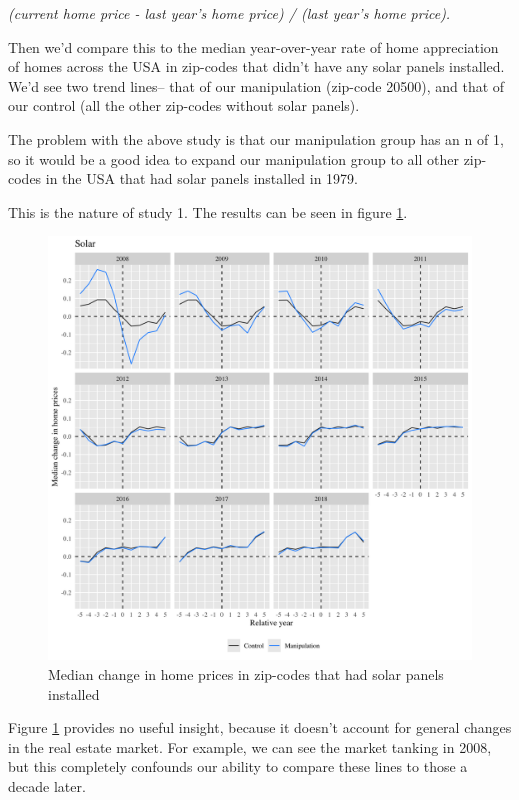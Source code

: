 \documentclass{article}
\begin{document}
\noindent\textit{(current home price - last year's home price) / (last year's home price). }

Then we'd compare this to the median year-over-year rate of home appreciation of homes across the USA in zip-codes that didn't have any solar panels installed.
We'd see two trend lines-- that of our manipulation (zip-code 20500), and that of our control (all the other zip-codes without solar panels).

The problem with the above study is that our manipulation group has an n of 1, so it would be a good idea to expand our manipulation group to all other zip-codes in the USA that had solar panels installed in 1979.

This is the nature of study 1.
The results can be seen in figure \ref{study1solarfacets}.
\begin{figure}[h]
\centering
\includegraphics[width=0.9\linewidth]
{study1_solar_facets.png} 
\caption{Median change in home prices in zip-codes that had solar panels installed}
\label{study1solarfacets}
\end{figure}

Figure \ref{study1solarfacets} provides no useful insight, because it doesn't account for general changes in the real estate market.
For example, we can see the market tanking in 2008, but this completely confounds our ability to compare these lines to those a decade later.
\end{document}
